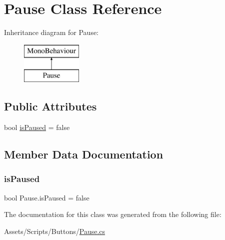 \hypertarget{class_pause}{}\section{Pause Class Reference}
\label{class_pause}
Inheritance diagram for Pause\+:\begin{figure}[H]
\begin{center}
\leavevmode
\includegraphics[height=2.000000cm]{class_pause}
\end{center}
\end{figure}
\subsection*{Public Attributes}
\begin{DoxyCompactItemize}
\item 
bool \mbox{\hyperlink{class_pause_ae845c846c4be05e29c8948089f57eec0}{is\+Paused}} = false
\end{DoxyCompactItemize}


\subsection{Member Data Documentation}
\mbox{\label{class_pause_ae845c846c4be05e29c8948089f57eec0}} 
\subsubsection{\texorpdfstring{is\+Paused}{isPaused}}
{\footnotesize\ttfamily bool Pause.\+is\+Paused = false}



The documentation for this class was generated from the following file\+:\begin{DoxyCompactItemize}
\item 
Assets/\+Scripts/\+Buttons/\mbox{\hyperlink{_pause_8cs}{Pause.\+cs}}\end{DoxyCompactItemize}
